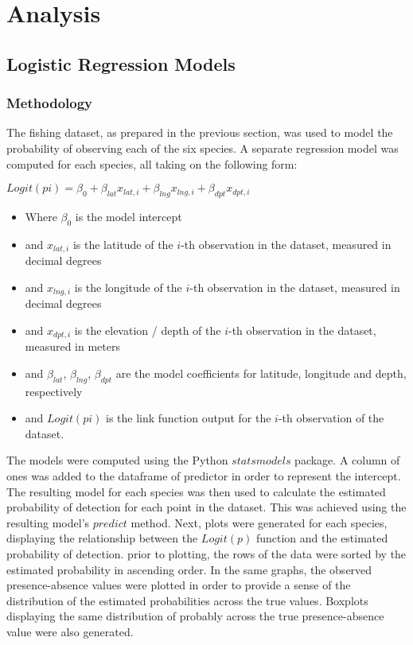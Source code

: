 \section{Analysis}

\subsection{Logistic Regression Models}

\subsubsection{Methodology}

The fishing dataset, as prepared in the previous section, was used to model the probability of observing each of the six species.
A separate regression model was computed for each species, all taking on the following form:\linebreak

\tabto{2cm} ${Logit}(pi) = \beta_0 + \beta_{lat} x_{lat,i} + \beta_{lng} x_{lng,i} + \beta_{dpt} x_{dpt,i}$

\begin{itemize}
    \item Where $\beta_{0}$ is the model intercept
    \item and $x_{lat, i}$ is the latitude of the $i$-th observation in the dataset, measured in decimal degrees
    \item and $x_{lng, i}$ is the longitude of the $i$-th observation in the dataset, measured in decimal degrees
    \item and $x_{dpt, i}$ is the elevation / depth of the $i$-th observation in the dataset, measured in meters
    \item and $\beta_{lat}$, $\beta_{lng}$, $\beta_{dpt}$ are the model coefficients for latitude, longitude and depth, respectively
    \item and ${Logit}(pi)$ is the link function output for the $i$-th observation of the dataset.
\end{itemize}

The models were computed using the Python $statsmodels$ package.
A column of ones was added to the dataframe of predictor in order to represent the intercept.
The resulting model for each species was then used to calculate the estimated probability of detection for each point in the dataset.
This was achieved using the resulting model's $predict$ method.
Next, plots were generated for each species, displaying the relationship between the $Logit(p)$ function and the estimated probability of detection.
prior to plotting, the rows of the data were sorted by the estimated probability in ascending order.
In the same graphs, the observed presence-absence values were plotted in order to provide a sense of the distribution
of the estimated probabilities across the true values.
Boxplots displaying the same distribution of probably across the true presence-absence value were also generated.

